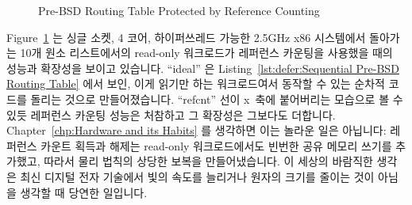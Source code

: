 \begin{figure}[tb]
\centering
{}
\caption{Pre-BSD Routing Table Protected by Reference Counting}
\label{fig:defer:Pre-BSD Routing Table Protected by Reference Counting}
\end{figure}

Figure~\ref{fig:defer:Pre-BSD Routing Table Protected by Reference Counting}
는 싱글 소켓, 4 코어, 하이퍼쓰레드 가능한 2.5GHz x86 시스템에서 돌아가는 10개
원소 리스트에서의 read-only 워크로드가 레퍼런스 카운팅을 사용했을 때의 성능과
확장성을 보이고 있습니다.
``ideal'' 은
Listing~\ref{lst:defer:Sequential Pre-BSD Routing Table} 에서 보인, 이게 읽기만
하는 워크로드여서 동작할 수 있는 순차적 코드를
돌리는 것으로 만들어졌습니다.
``refcnt'' 선이 x~축에 붙어버리는 모습으로 볼 수 있듯 레퍼런스 카운팅 성능은
처참하고 그 확장성은 그보다도 더합니다.
Chapter~\ref{chp:Hardware and its Habits} 를 생각하면 이는 놀라운 일은
아닙니다:
레퍼런스 카운트 획득과 해제는 read-only 워크로드에서도 빈번한 공유 메모리
쓰기를 추가했고, 따라서 물리 법칙의 상당한 보복을 만들어냈습니다.
이 세상의 바람직한 생각은 최신 디지털 전자 기술에서 빛의 속도를 늘리거나 원자의
크기를 줄이는 것이 아님을 생각할 때 당연한 일입니다.
\iffalse

